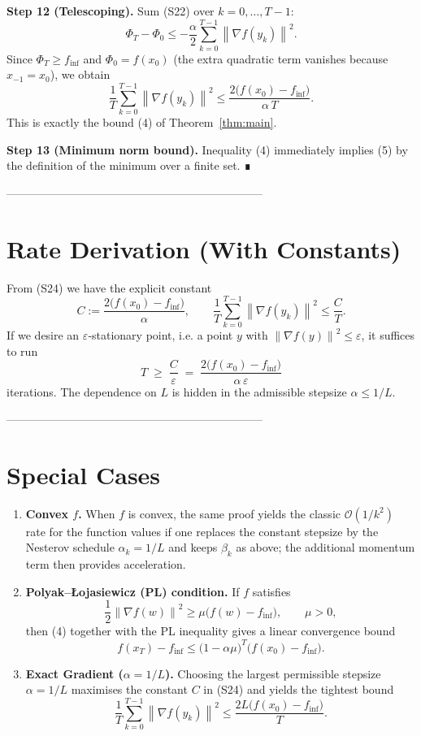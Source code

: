 \documentclass{article}
\newcommand{\norm}[1]{\left\lVert#1\right\rVert}
\begin{document}
\noindent\textbf{Step 12 (Telescoping).}  
Sum (S22) over $k=0,\dots,T-1$:
\[
\Phi_T-\Phi_0 \le -\frac{\alpha}{2}\sum_{k=0}^{T-1}\norm{\nabla f(y_k)}^2 .
\tag{S23}
\]
Since $\Phi_T\ge f_{\inf}$ and $\Phi_0 = f(x_0)$ (the extra quadratic term vanishes because $x_{-1}=x_0$), we obtain
\[
\frac{1}{T}\sum_{k=0}^{T-1}\norm{\nabla f(y_k)}^2
\le \frac{2\bigl(f(x_0)-f_{\inf}\bigr)}{\alpha\,T}.
\tag{S24}
\]
This is exactly the bound (4) of Theorem~\ref{thm:main}.

\noindent\textbf{Step 13 (Minimum norm bound).}  
Inequality (4) immediately implies (5) by the definition of the minimum over a finite set.  ∎

--------------------------------------------------------------------

\section*{Rate Derivation (With Constants)}
From (S24) we have the explicit constant
\[
C:=\frac{2\bigl(f(x_0)-f_{\inf}\bigr)}{\alpha},
\qquad
\frac{1}{T}\sum_{k=0}^{T-1}\norm{\nabla f(y_k)}^2\le \frac{C}{T}.
\]
If we desire an $\varepsilon$‑stationary point, i.e. a point $y$ with $\norm{\nabla f(y)}^2\le\varepsilon$, it suffices to run
\[
T\;\ge\;\frac{C}{\varepsilon}
\;=\;
\frac{2\bigl(f(x_0)-f_{\inf}\bigr)}{\alpha\,\varepsilon}
\]
iterations.  The dependence on $L$ is hidden in the admissible stepsize $\alpha\le 1/L$.

--------------------------------------------------------------------

\section*{Special Cases}
\begin{enumerate}
\item \textbf{Convex $f$.}  When $f$ is convex, the same proof yields the classic $\mathcal O(1/k^2)$ rate for the function values if one replaces the constant stepsize by the Nesterov schedule $\alpha_k = 1/L$ and keeps $\beta_k$ as above; the additional momentum term then provides acceleration.

\item \textbf{Polyak–Łojasiewicz (PL) condition.}  If $f$ satisfies
\[
\frac{1}{2}\norm{\nabla f(w)}^2\ge \mu\bigl(f(w)-f_{\inf}\bigr),\qquad \mu>0,
\]
then (4) together with the PL inequality gives a linear convergence bound
\[
f(x_T)-f_{\inf}\le \bigl(1-\alpha\mu\bigr)^T\bigl(f(x_0)-f_{\inf}\bigr).
\]

\item \textbf{Exact Gradient ($\alpha=1/L$).}  Choosing the largest permissible stepsize $\alpha=1/L$ maximises the constant $C$ in (S24) and yields the tightest bound
\[
\frac{1}{T}\sum_{k=0}^{T-1}\norm{\nabla f(y_k)}^2
\le \frac{2L\bigl(f(x_0)-f_{\inf}\bigr)}{T}.
\]

\end{enumerate}
\end{document}
